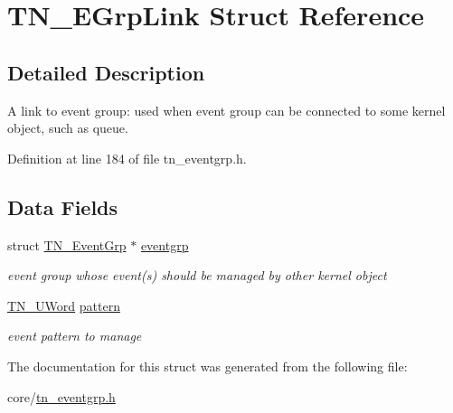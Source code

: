 \hypertarget{structTN__EGrpLink}{\section{T\+N\+\_\+\+E\+Grp\+Link Struct Reference}
\label{structTN__EGrpLink}
}


\subsection{Detailed Description}
A link to event group\+: used when event group can be connected to some kernel object, such as queue. 

Definition at line 184 of file tn\+\_\+eventgrp.\+h.

\subsection*{Data Fields}
\begin{DoxyCompactItemize}
\item 
\hypertarget{structTN__EGrpLink_a033de1028488c16a62718b2e9c8eb37f}{struct \hyperlink{structTN__EventGrp}{T\+N\+\_\+\+Event\+Grp} $\ast$ \hyperlink{structTN__EGrpLink_a033de1028488c16a62718b2e9c8eb37f}{eventgrp}}\label{structTN__EGrpLink_a033de1028488c16a62718b2e9c8eb37f}

\begin{DoxyCompactList}\small\item\em event group whose event(s) should be managed by other kernel object \end{DoxyCompactList}\item 
\hypertarget{structTN__EGrpLink_a576dde889abb0efae1f253c12a1eed64}{\hyperlink{tn__arch__example_8h_ab80cba0fe9ffcd9011d53dfeb9e39bf4}{T\+N\+\_\+\+U\+Word} \hyperlink{structTN__EGrpLink_a576dde889abb0efae1f253c12a1eed64}{pattern}}\label{structTN__EGrpLink_a576dde889abb0efae1f253c12a1eed64}

\begin{DoxyCompactList}\small\item\em event pattern to manage \end{DoxyCompactList}\end{DoxyCompactItemize}


The documentation for this struct was generated from the following file\+:\begin{DoxyCompactItemize}
\item 
core/\hyperlink{tn__eventgrp_8h}{tn\+\_\+eventgrp.\+h}\end{DoxyCompactItemize}

